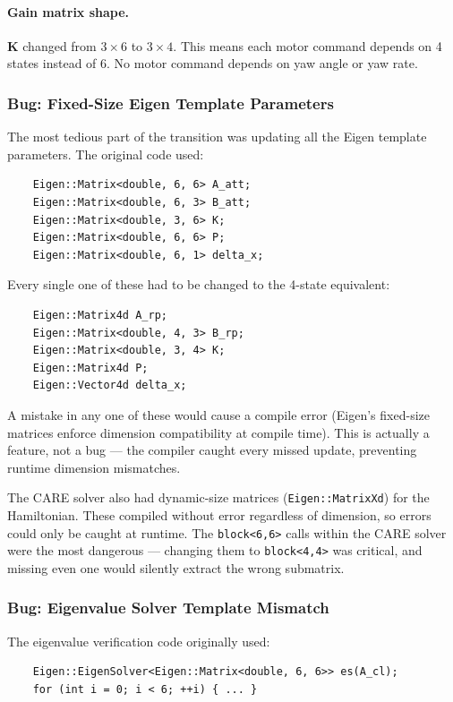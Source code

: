 \documentclass[12pt, a4paper]{article}
\newcommand{\bK}{\bm{K}}
\begin{document}
\paragraph{Gain matrix shape.}  $\bK$ changed from $3 \times 6$ to $3 \times 4$.  This means each motor command depends on 4 states instead of 6.  No motor command depends on yaw angle or yaw rate.

\subsubsection{Bug: Fixed-Size Eigen Template Parameters}

The most tedious part of the transition was updating all the Eigen template parameters.  The original code used:
\begin{verbatim}
    Eigen::Matrix<double, 6, 6> A_att;
    Eigen::Matrix<double, 6, 3> B_att;
    Eigen::Matrix<double, 3, 6> K;
    Eigen::Matrix<double, 6, 6> P;
    Eigen::Matrix<double, 6, 1> delta_x;
\end{verbatim}

Every single one of these had to be changed to the 4-state equivalent:
\begin{verbatim}
    Eigen::Matrix4d A_rp;
    Eigen::Matrix<double, 4, 3> B_rp;
    Eigen::Matrix<double, 3, 4> K;
    Eigen::Matrix4d P;
    Eigen::Vector4d delta_x;
\end{verbatim}

A mistake in any one of these would cause a compile error (Eigen's fixed-size matrices enforce dimension compatibility at compile time).  This is actually a feature, not a bug --- the compiler caught every missed update, preventing runtime dimension mismatches.

The CARE solver also had dynamic-size matrices (\texttt{Eigen::MatrixXd}) for the Hamiltonian.  These compiled without error regardless of dimension, so errors could only be caught at runtime.  The \texttt{block<6,6>} calls within the CARE solver were the most dangerous --- changing them to \texttt{block<4,4>} was critical, and missing even one would silently extract the wrong submatrix.

\subsubsection{Bug: Eigenvalue Solver Template Mismatch}

The eigenvalue verification code originally used:
\begin{verbatim}
    Eigen::EigenSolver<Eigen::Matrix<double, 6, 6>> es(A_cl);
    for (int i = 0; i < 6; ++i) { ... }
\end{verbatim}
\end{document}
